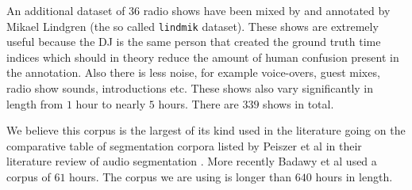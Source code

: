 \documentclass[twocolumn]{article}
\begin{document}
	An additional dataset of $36$ radio shows have been mixed by and annotated by Mikael Lindgren (the so called \texttt{lindmik} dataset). These shows are extremely useful because the DJ is the same person that created the ground truth time indices which should in theory reduce the amount of human confusion present in the annotation. Also there is less noise, for example voice-overs, guest mixes, radio show sounds, introductions etc. These shows also vary significantly in length from $1$ hour to nearly $5$ hours. There are $339$ shows in total.
	
	We believe this corpus is the largest of its kind used in the literature going on the comparative table of segmentation corpora listed by Peiszer et al in their literature review of audio segmentation \cite{peiszer2008automatic}. More recently Badawy et al \citep{elaudio} used a corpus of $61$ hours. The corpus we are using is longer than $640$ hours in length. 
	
\begin{table}
	\centering
	\label{tab:corpus}
	\caption{Descriptive statistics about the corpus.}
	\bigskip
\end{table}
\end{document}
